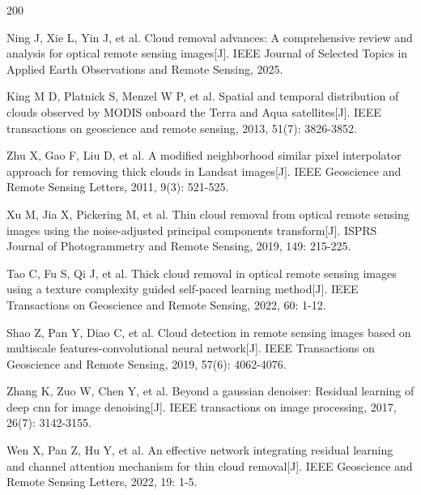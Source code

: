 


\begin{thebibliography}{200}
\wuhao %
\linespread{1}\selectfont
\setlength{\itemsep}{-1.4ex} %
\thispagestyle{others}
\pagestyle{others}

\makeatletter
\renewcommand\@biblabel[1]{[#1]\hfill} %
\makeatother
\setlength{\labelsep}{0cm}



Ning J, Xie L, Yin J, et al. Cloud removal advances: A comprehensive review and analysis for optical remote sensing images[J]. IEEE Journal of Selected Topics in Applied Earth Observations and Remote Sensing, 2025.


King M D, Platnick S, Menzel W P, et al. Spatial and temporal distribution of clouds observed by MODIS onboard the Terra and Aqua satellites[J]. IEEE transactions on geoscience and remote sensing, 2013, 51(7): 3826-3852.

Zhu X, Gao F, Liu D, et al. A modified neighborhood similar pixel interpolator approach for removing thick clouds in Landsat images[J]. IEEE Geoscience and Remote Sensing Letters, 2011, 9(3): 521-525.

Xu M, Jia X, Pickering M, et al. Thin cloud removal from optical remote sensing images using the noise-adjusted principal components transform[J]. ISPRS Journal of Photogrammetry and Remote Sensing, 2019, 149: 215-225.

Tao C, Fu S, Qi J, et al. Thick cloud removal in optical remote sensing images using a texture complexity guided self-paced learning method[J]. IEEE Transactions on Geoscience and Remote Sensing, 2022, 60: 1-12.

Shao Z, Pan Y, Diao C, et al. Cloud detection in remote sensing images based on multiscale features-convolutional neural network[J]. IEEE Transactions on Geoscience and Remote Sensing, 2019, 57(6): 4062-4076.

Zhang K, Zuo W, Chen Y, et al. Beyond a gaussian denoiser: Residual learning of deep cnn for image denoising[J]. IEEE transactions on image processing, 2017, 26(7): 3142-3155.

Wen X, Pan Z, Hu Y, et al. An effective network integrating residual learning and channel attention mechanism for thin cloud removal[J]. IEEE Geoscience and Remote Sensing Letters, 2022, 19: 1-5.


\end{thebibliography}
